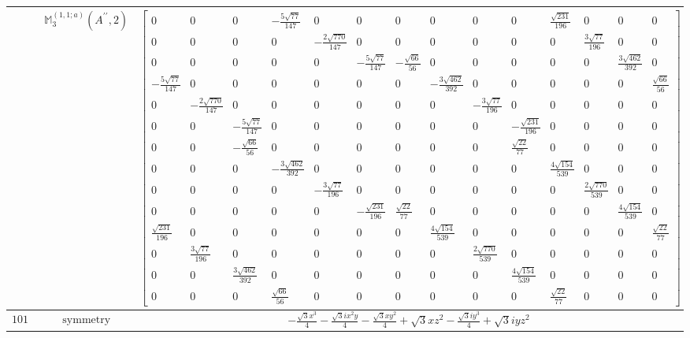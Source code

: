 \documentclass[fleqn,8pt,landscape]{jsarticle}
\begin{document}
\begin{longtable}{ccc}
$  $ & $ \mathbb{M}_{3}^{(1,1;a)}(A^{\prime\prime},2) $ & $ \begin{bmatrix} 0 & 0 & 0 & - \frac{5 \sqrt{77}}{147} & 0 & 0 & 0 & 0 & 0 & 0 & \frac{\sqrt{231}}{196} & 0 & 0 & 0 \\ 0 & 0 & 0 & 0 & - \frac{2 \sqrt{770}}{147} & 0 & 0 & 0 & 0 & 0 & 0 & \frac{3 \sqrt{77}}{196} & 0 & 0 \\ 0 & 0 & 0 & 0 & 0 & - \frac{5 \sqrt{77}}{147} & - \frac{\sqrt{66}}{56} & 0 & 0 & 0 & 0 & 0 & \frac{3 \sqrt{462}}{392} & 0 \\ - \frac{5 \sqrt{77}}{147} & 0 & 0 & 0 & 0 & 0 & 0 & - \frac{3 \sqrt{462}}{392} & 0 & 0 & 0 & 0 & 0 & \frac{\sqrt{66}}{56} \\ 0 & - \frac{2 \sqrt{770}}{147} & 0 & 0 & 0 & 0 & 0 & 0 & - \frac{3 \sqrt{77}}{196} & 0 & 0 & 0 & 0 & 0 \\ 0 & 0 & - \frac{5 \sqrt{77}}{147} & 0 & 0 & 0 & 0 & 0 & 0 & - \frac{\sqrt{231}}{196} & 0 & 0 & 0 & 0 \\ 0 & 0 & - \frac{\sqrt{66}}{56} & 0 & 0 & 0 & 0 & 0 & 0 & \frac{\sqrt{22}}{77} & 0 & 0 & 0 & 0 \\ 0 & 0 & 0 & - \frac{3 \sqrt{462}}{392} & 0 & 0 & 0 & 0 & 0 & 0 & \frac{4 \sqrt{154}}{539} & 0 & 0 & 0 \\ 0 & 0 & 0 & 0 & - \frac{3 \sqrt{77}}{196} & 0 & 0 & 0 & 0 & 0 & 0 & \frac{2 \sqrt{770}}{539} & 0 & 0 \\ 0 & 0 & 0 & 0 & 0 & - \frac{\sqrt{231}}{196} & \frac{\sqrt{22}}{77} & 0 & 0 & 0 & 0 & 0 & \frac{4 \sqrt{154}}{539} & 0 \\ \frac{\sqrt{231}}{196} & 0 & 0 & 0 & 0 & 0 & 0 & \frac{4 \sqrt{154}}{539} & 0 & 0 & 0 & 0 & 0 & \frac{\sqrt{22}}{77} \\ 0 & \frac{3 \sqrt{77}}{196} & 0 & 0 & 0 & 0 & 0 & 0 & \frac{2 \sqrt{770}}{539} & 0 & 0 & 0 & 0 & 0 \\ 0 & 0 & \frac{3 \sqrt{462}}{392} & 0 & 0 & 0 & 0 & 0 & 0 & \frac{4 \sqrt{154}}{539} & 0 & 0 & 0 & 0 \\ 0 & 0 & 0 & \frac{\sqrt{66}}{56} & 0 & 0 & 0 & 0 & 0 & 0 & \frac{\sqrt{22}}{77} & 0 & 0 & 0 \end{bmatrix} $ \\ \hline
$ 1012 $ & $ \text{symmetry} $ & $ - \frac{\sqrt{3} x^{3}}{4} - \frac{\sqrt{3} i x^{2} y}{4} - \frac{\sqrt{3} x y^{2}}{4} + \sqrt{3} x z^{2} - \frac{\sqrt{3} i y^{3}}{4} + \sqrt{3} i y z^{2} $ \\

\end{longtable}
\end{document}
